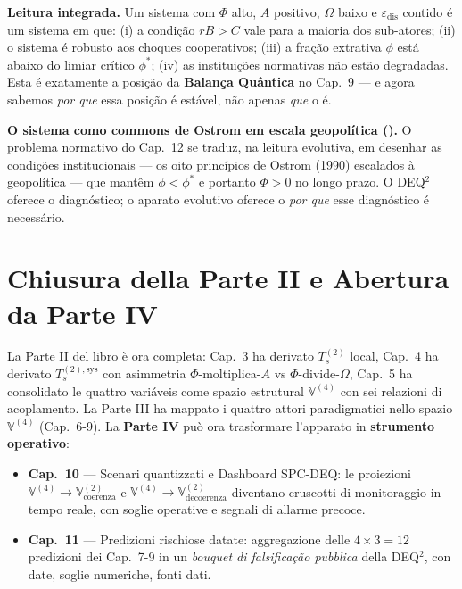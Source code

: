 \Proved{} \textbf{Leitura integrada.} Um sistema com \(\Phi\) alto,
\(A\) positivo, \(\Omega\) baixo e \(\varepsilon_{\text{dis}}\) contido
\'{e} um sistema em que: (i) a condi\c{c}\~{a}o \(rB > C\) vale para a
maioria dos sub-atores; (ii) o sistema \'{e} robusto aos choques
cooperativos; (iii) a fra\c{c}\~{a}o extrativa \(\phi\) est\'{a} abaixo
do limiar cr\'{i}tico \(\phi^*\); (iv) as institui\c{c}\~{o}es normativas
n\~{a}o est\~{a}o degradadas. Esta \'{e} exatamente a posi\c{c}\~{a}o da
\textbf{Balan\c{c}a Qu\^{a}ntica} no Cap.~9 --- e agora sabemos
\emph{por que} essa posi\c{c}\~{a}o \'{e} est\'{a}vel, n\~{a}o apenas
\emph{que} o \'{e}.

\Hypoth{} \textbf{O sistema como commons de Ostrom em escala geopo\-l\'{i}tica
(\Hypoth{}).} O problema normativo do Cap.~12 se traduz, na leitura
evolutiva, em desenhar as condi\c{c}\~{o}es institucionais --- os oito
princ\'{i}pios de Ostrom (1990) escalados \`{a} geopo\-l\'{i}tica ---
que mant\^{e}m \(\phi < \phi^*\) e portanto \(\Phi > 0\) no longo prazo.
O DEQ$^2$ oferece o diagn\'{o}stico; o aparato evolutivo oferece o
\emph{por que} esse diagn\'{o}stico \'{e} necess\'{a}rio.



\section{Chiusura della Parte II e Abertura da Parte
IV}\label{chiusura-della-parte-ii-e-apertura-della-parte-iv}

La Parte II del libro è ora completa: Cap.~3 ha derivato \(T_s^{(2)}\)
local, Cap.~4 ha derivato \(T_s^{(2),\text{sys}}\) con asimmetria
\(\Phi\)-moltiplica-\(A\) vs \(\Phi\)-divide-\(\Omega\), Cap.~5 ha
consolidato le quattro variáveis come spazio estrutural
\(\mathbb{V}^{(4)}\) con sei relazioni di acoplamento. La Parte III ha
mappato i quattro attori paradigmatici nello spazio \(\mathbb{V}^{(4)}\)
(Cap.~6-9). La \textbf{Parte IV} può ora trasformare l'apparato in
\textbf{strumento operativo}:

\begin{itemize}
\tightlist
\item
  \textbf{Cap.~10} --- Scenari quantizzati e Dashboard SPC-DEQ: le
  proiezioni \(\mathbb{V}^{(4)} \to \mathbb{V}^{(2)}_{\text{coerenza}}\)
  e \(\mathbb{V}^{(4)} \to \mathbb{V}^{(2)}_{\text{decoerenza}}\)
  diventano cruscotti di monitoraggio in tempo reale, con soglie
  operative e segnali di allarme precoce.
\item
  \textbf{Cap.~11} --- Predizioni rischiose datate: aggregazione delle
  \(4 \times 3 = 12\) predizioni dei Cap.~7-9 in un \emph{bouquet di
  falsificação pubblica} della DEQ$^2$, con date, soglie numeriche, fonti
  dati.
\end{itemize}


